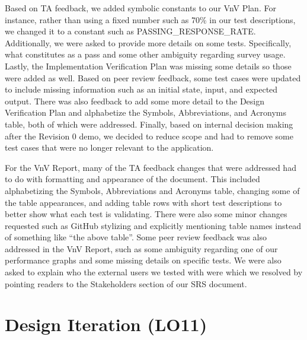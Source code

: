 \documentclass{article}
\begin{document}
Based on TA feedback, we added symbolic constants to our VnV Plan. For instance, rather than
using a fixed number such as 70\% in our test descriptions, we changed it to a constant such
as PASSING\_RESPONSE\_RATE. Additionally, we were asked to provide more details on some tests. Specifically,
what constitutes as a pass and some other ambiguity regarding survey usage. Lastly, the
Implementation Verification Plan was missing some details so those were added as well. Based on peer review feedback,
some test cases were updated to include missing information such as an initial state, input, and expected output.
There was also feedback to add some more detail to the Design Verification Plan and alphabetize the Symbols,
Abbreviations, and Acronyms table, both of which were addressed. Finally, based on internal decision making
after the Revision 0 demo, we decided to reduce scope and had to remove some test cases that were no longer
relevant to the application.

For the VnV Report, many of the TA feedback changes that were addressed had to do with formatting and
appearance of the document. This included alphabetizing the Symbols, Abbreviations and Acronyms table,
changing some of the table appearances, and adding table rows with short test descriptions to better show
what each test is validating. There were also some minor changes requested such as GitHub stylizing and
explicitly mentioning table names instead of something like ``the above table''. Some peer review feedback
was also addressed in the VnV Report, such as some ambiguity regarding one of our performance graphs and some
missing details on specific tests. We were also asked to explain who the external users we tested with were which
we resolved by pointing readers to the Stakeholders section of our SRS document.

\section{Design Iteration (LO11)}

\end{document}
